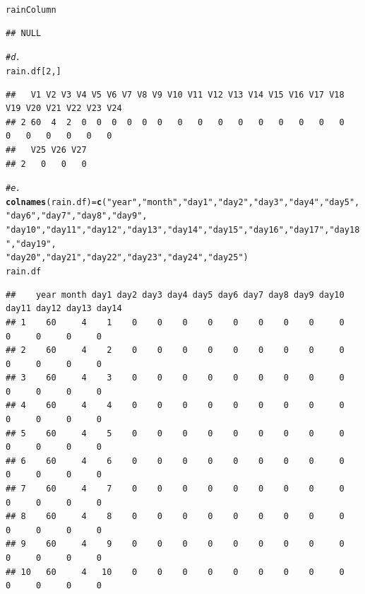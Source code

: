 \documentclass{article}\usepackage[]{graphicx}\usepackage[]{xcolor}
\makeatletter
\newcommand{\hlnum}[1]{\textcolor[rgb]{0.686,0.059,0.569}{#1}}%
\newcommand{\hlstr}[1]{\textcolor[rgb]{0.192,0.494,0.8}{#1}}%
\newcommand{\hlcom}[1]{\textcolor[rgb]{0.678,0.584,0.686}{\textit{#1}}}%
\newcommand{\hlstd}[1]{\textcolor[rgb]{0.345,0.345,0.345}{#1}}%
\newcommand{\hlkwb}[1]{\textcolor[rgb]{0.69,0.353,0.396}{#1}}%
\newcommand{\hlkwd}[1]{\textcolor[rgb]{0.737,0.353,0.396}{\textbf{#1}}}%
\newenvironment{kframe}{%
 \def\at@end@of@kframe{}%
 \ifinner\ifhmode%
  \def\at@end@of@kframe{\end{minipage}}%
  \begin{minipage}{\columnwidth}%
 \fi\fi%
 \def\FrameCommand##1{\hskip\@totalleftmargin \hskip-\fboxsep
 \colorbox{shadecolor}{##1}\hskip-\fboxsep
     \hskip-\linewidth \hskip-\@totalleftmargin \hskip\columnwidth}%
 \MakeFramed {\advance\hsize-\width
   \@totalleftmargin\z@ \linewidth\hsize
   \@setminipage}}%
 {\par\unskip\endMakeFramed%
 \at@end@of@kframe}
\newenvironment{knitrout}{}{} %
\makeatother
\begin{document}
\begin{knitrout}
\begin{kframe}
\begin{alltt}
\hlstd{rainColumn}
\end{alltt}
\begin{verbatim}
## NULL
\end{verbatim}
\begin{alltt}
\hlcom{#d.}
\hlstd{rain.df[}\hlnum{2}\hlstd{,]}
\end{alltt}
\begin{verbatim}
##   V1 V2 V3 V4 V5 V6 V7 V8 V9 V10 V11 V12 V13 V14 V15 V16 V17 V18 V19 V20 V21 V22 V23 V24
## 2 60  4  2  0  0  0  0  0  0   0   0   0   0   0   0   0   0   0   0   0   0   0   0   0
##   V25 V26 V27
## 2   0   0   0
\end{verbatim}
\begin{alltt}
\hlcom{#e.}
\hlkwd{colnames}\hlstd{(rain.df)} \hlkwb{=} \hlkwd{c}\hlstd{(}\hlstr{"year"}\hlstd{,}\hlstr{"month"}\hlstd{,}\hlstr{"day1"}\hlstd{,}\hlstr{"day2"}\hlstd{,}\hlstr{"day3"}\hlstd{,}\hlstr{"day4"}\hlstd{,}\hlstr{"day5"}\hlstd{,}\hlstr{"day6"}\hlstd{,}\hlstr{"day7"}\hlstd{,}\hlstr{"day8"}\hlstd{,}\hlstr{"day9"}\hlstd{,}
                    \hlstr{"day10"}\hlstd{,}\hlstr{"day11"}\hlstd{,}\hlstr{"day12"}\hlstd{,}\hlstr{"day13"}\hlstd{,}\hlstr{"day14"}\hlstd{,}\hlstr{"day15"}\hlstd{,}\hlstr{"day16"}\hlstd{,}\hlstr{"day17"}\hlstd{,}\hlstr{"day18"}\hlstd{,}\hlstr{"day19"}\hlstd{,}
                    \hlstr{"day20"}\hlstd{,}\hlstr{"day21"}\hlstd{,}\hlstr{"day22"}\hlstd{,}\hlstr{"day23"}\hlstd{,}\hlstr{"day24"}\hlstd{,}\hlstr{"day25"}\hlstd{)}
\hlstd{rain.df}
\end{alltt}
\begin{verbatim}
##    year month day1 day2 day3 day4 day5 day6 day7 day8 day9 day10 day11 day12 day13 day14
## 1    60     4    1    0    0    0    0    0    0    0    0     0     0     0     0     0
## 2    60     4    2    0    0    0    0    0    0    0    0     0     0     0     0     0
## 3    60     4    3    0    0    0    0    0    0    0    0     0     0     0     0     0
## 4    60     4    4    0    0    0    0    0    0    0    0     0     0     0     0     0
## 5    60     4    5    0    0    0    0    0    0    0    0     0     0     0     0     0
## 6    60     4    6    0    0    0    0    0    0    0    0     0     0     0     0     0
## 7    60     4    7    0    0    0    0    0    0    0    0     0     0     0     0     0
## 8    60     4    8    0    0    0    0    0    0    0    0     0     0     0     0     0
## 9    60     4    9    0    0    0    0    0    0    0    0     0     0     0     0     0
## 10   60     4   10    0    0    0    0    0    0    0    0     0     0     0     0     0

\end{verbatim}
\end{kframe}
\end{knitrout}
\end{document}
